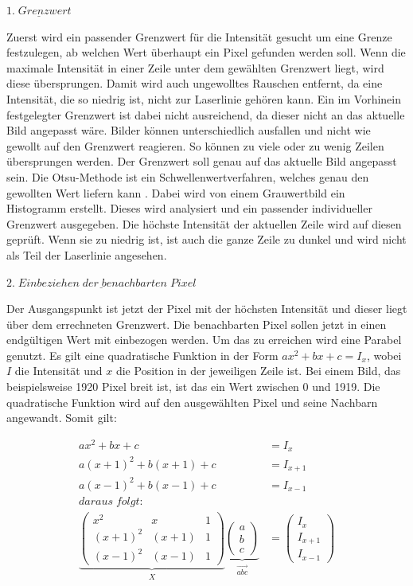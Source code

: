 	$\underline{1. \; Grenzwert}$
	
	Zuerst wird ein passender Grenzwert für die Intensität gesucht um eine Grenze festzulegen, ab welchen Wert überhaupt ein Pixel gefunden werden soll. Wenn die maximale Intensität in einer Zeile unter dem gewählten Grenzwert liegt, wird diese übersprungen. Damit wird auch ungewolltes Rauschen entfernt, da eine Intensität, die so niedrig ist, nicht zur Laserlinie gehören kann. Ein im Vorhinein festgelegter Grenzwert ist dabei nicht ausreichend, da dieser nicht an das aktuelle Bild angepasst wäre. Bilder können unterschiedlich ausfallen und nicht wie gewollt auf den Grenzwert reagieren. So können zu viele oder zu wenig Zeilen übersprungen werden. Der Grenzwert soll genau auf das aktuelle Bild angepasst sein. Die Otsu-Methode ist ein Schwellenwertverfahren, welches genau den gewollten Wert liefern kann \citep{otsu_tlreshold_nodate}. Dabei wird von einem Grauwertbild ein Histogramm erstellt. Dieses wird analysiert und ein passender individueller Grenzwert ausgegeben. Die höchste Intensität der aktuellen Zeile wird auf diesen geprüft. Wenn sie zu niedrig ist, ist auch die ganze Zeile zu dunkel und wird nicht als Teil der Laserlinie angesehen.
	
	$\underline{2. \; Einbeziehen \; der \; benachbarten \; Pixel}$
	
	Der Ausgangspunkt ist jetzt der Pixel mit der höchsten Intensität und dieser liegt über dem errechneten Grenzwert. Die benachbarten Pixel sollen jetzt in einen endgültigen Wert mit einbezogen werden. Um das zu erreichen wird eine Parabel genutzt. Es gilt eine quadratische Funktion in der Form \( ax^2 + bx + c = I_x \), wobei \( I \) die Intensität und \( x \) die Position in der jeweiligen Zeile ist. Bei einem Bild, das beispielsweise 1920 Pixel breit ist, ist das ein Wert zwischen 0 und 1919. Die quadratische Funktion wird auf den ausgewählten Pixel und seine Nachbarn angewandt. Somit gilt:
	
	\begin{equation}
	\begin{aligned}
	ax^2 + bx + c &= I_x \\
	a(x+1)^2 + b(x+1) + c &= I_{x+1} \\
	a(x-1)^2 + b(x-1) + c &= I_{x-1} \\
	daraus \; folgt: \\
	\underbrace{\begin{pmatrix}
		x^2 & x & 1 \\
		(x+1)^2 & (x+1) & 1 \\
		(x-1)^2 & (x-1) & 1 
		\end{pmatrix}}_{\substack{X}} \underbrace{ \begin{pmatrix}
		a \\
		b \\
		c
		\end{pmatrix}}_{\substack{\vec{abc}}} &= \begin{pmatrix}
	I_x \\
	I_{x+1} \\
	I_{x-1}
	\end{pmatrix}
	\end{aligned}
	\label{eq:subpixel_x}
	\end{equation}
	
